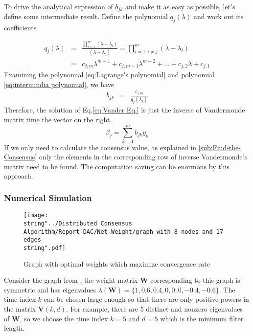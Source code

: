 To drive the analytical expression of $b_{jk}$ and make it as easy
as possible, let's define some intermediate result. Define the polynomial
$q_{j}\left(\lambda\right)$ and work out its coefficients

\begin{eqnarray}
q_{j}\left(\lambda\right) & = & \frac{\prod_{i=1}^{m}\left(\lambda-\lambda_{i}\right)}{\left(\lambda-\lambda_{j}\right)}=\prod_{i=1,i\neq j}^{m}\left(\lambda-\lambda_{i}\right)\label{eq:intermindia polynomial}\\
 & = & c_{j,m}\lambda^{m-1}+c_{j,m-1}\lambda^{m-2}+\ldots+c_{j,2}\lambda+c_{j,1}\nonumber 
\end{eqnarray}
Examining the polynomial \ref{eq:Lagrange's polynomial} and polynomial
\ref{eq:intermindia polynomial}, we have 
\begin{eqnarray*}
b_{jk} & = & \frac{c_{j,m}}{q_{j}\left(\lambda_{j}\right)}
\end{eqnarray*}
Therefore, the solution of Eq.\ref{eq:Vander Eq.} is just the inverse
of Vandermonde matrix time the vector on the right. 
\[
\beta_{j}=\sum_{k=1}^{m}b_{jk}y_{k}
\]
If we only need to calculate the consensus value, as explained in
\ref{sub:Find-the-Consensus} only the elements in the corresponding
row of inverse Vandermonde's matrix need to be found. The computation
saving can be enormous by this approach.


\subsubsection{\label{sub:Numerical-Simulation}Numerical Simulation}

\begin{figure}
\hfill{}\texttt{[image: \\string"../Distributed Consensus Algorithm/Report\_DAC/Net\_Weight/graph with 8 nodes and 17 edges\\string".pdf]}\hfill{}\hfill{}\caption{\label{fig:Graph in Xiao'paper}Graph with optimal weights which maximize
convergence rate }
\end{figure}


Consider the graph from \cite{Xiao2004}, the weight matrix \textbf{$\mathbf{W}$}
corresponding to this graph is symmetric and has eigenvalues $\lambda(\mathbf{W})=\{1,0.6,0.4,0,0,0,-0.4,-0.6\}$.
The time index $k$ can be chosen large enough so that there are only
positive powers in the matrix $\mathbf{V}(k,d)$. For example, there
are 5 distinct and nonzero eigenvalues of \textbf{$\mathbf{W}$},
so we choose the time index $k=5$ and $d=5$ which is the minimum
filter length.

